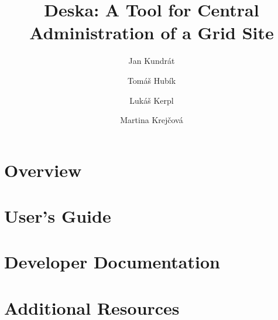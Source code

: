 \documentclass{book}
\begin{document}
\title{Deska: A Tool for Central Administration of a Grid Site}

\author{Jan Kundrát \and Tomáš Hubík \and Lukáš Kerpl \and Martina Krejčová}

\maketitle

\setcounter{tocdepth}{3}
\tableofcontents
\listoftodos

\part{Overview}



\part{User's Guide}






\part{Developer Documentation}












\part{Additional Resources}





\end{document}
